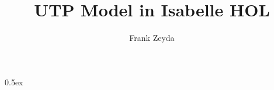 \documentclass[11pt,a4paper]{article}
\begin{document}
\title{UTP Model in Isabelle HOL}

\author{Frank Zeyda}

\maketitle

\tableofcontents

\parindent 0pt\parskip 0.5ex

%

\newpage



\newpage



\newpage



\newpage



\newpage



\newpage



\newpage



\newpage



\newpage



\newpage



\newpage



\newpage



\newpage



\newpage



%
%
\end{document}
